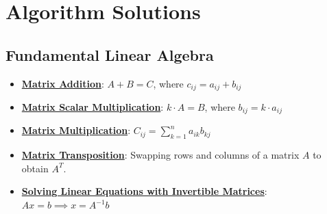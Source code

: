 \documentclass{article}%
\begin{document}
%
\section{Algorithm Solutions}%
\label{sec:AlgorithmSolutions}%
\subsection{Fundamental Linear Algebra}%
\label{subsec:FundamentalLinearAlgebra}%
\begin{itemize}[leftmargin=*]%
\item \href{https://purdue.brightspace.com/d2l/common/assets/pdfjs-d2l-dist/1.0.14-legacy/web/viewer.html?file=%2Fcontent%2Fenforced%2F1095467-wl.202510.CS.24300.001%2F04L1-Linear Algebra Primer.pdf%3Fou%3D1095467&lang=en-us&container=d2l-fileviewer-rendered-pdf&fullscreen=d2l-fileviewer-rendered-pdf-dialog&height=667#page=9}{\textbf{Matrix Addition}}: $A + B = C$, where $c_{ij} = a_{ij} + b_{ij}$%
\item \href{https://purdue.brightspace.com/d2l/common/assets/pdfjs-d2l-dist/1.0.14-legacy/web/viewer.html?file=%2Fcontent%2Fenforced%2F1095467-wl.202510.CS.24300.001%2F04L1-Linear Algebra Primer.pdf%3Fou%3D1095467&lang=en-us&container=d2l-fileviewer-rendered-pdf&fullscreen=d2l-fileviewer-rendered-pdf-dialog&height=667#page=9}{\textbf{Matrix Scalar Multiplication}}: $k \cdot A = B$, where $b_{ij} = k \cdot a_{ij}$%
\item \href{https://purdue.brightspace.com/d2l/common/assets/pdfjs-d2l-dist/1.0.14-legacy/web/viewer.html?file=%2Fcontent%2Fenforced%2F1095467-wl.202510.CS.24300.001%2F04L1-Linear Algebra Primer.pdf%3Fou%3D1095467&lang=en-us&container=d2l-fileviewer-rendered-pdf&fullscreen=d2l-fileviewer-rendered-pdf-dialog&height=667#page=14}{\textbf{Matrix Multiplication}}: $C_{ij} = \sum_{k=1}^{n} a_{ik}b_{kj}$%
\item \href{https://purdue.brightspace.com/d2l/common/assets/pdfjs-d2l-dist/1.0.14-legacy/web/viewer.html?file=%2Fcontent%2Fenforced%2F1095467-wl.202510.CS.24300.001%2F04L1-Linear Algebra Primer.pdf%3Fou%3D1095467&lang=en-us&container=d2l-fileviewer-rendered-pdf&fullscreen=d2l-fileviewer-rendered-pdf-dialog&height=667#page=16}{\textbf{Matrix Transposition}}: Swapping rows and columns of a matrix $A$ to obtain $A^T$.%
\item \href{https://purdue.brightspace.com/d2l/common/assets/pdfjs-d2l-dist/1.0.14-legacy/web/viewer.html?file=%2Fcontent%2Fenforced%2F1095467-wl.202510.CS.24300.001%2F04L1-Linear Algebra Primer.pdf%3Fou%3D1095467&lang=en-us&container=d2l-fileviewer-rendered-pdf&fullscreen=d2l-fileviewer-rendered-pdf-dialog&height=667#page=12}{\textbf{Solving Linear Equations with Invertible Matrices}}: $Ax = b \implies x = A^{-1}b$%
\end{itemize}
\end{document}
